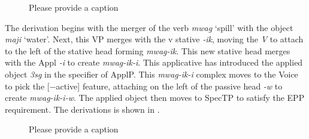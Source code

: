 \documentclass[output=paper]{langscibook}
\begin{document}
\begin{figure}
\caption{\label{fig:rmtree2}\color{red}Please provide a caption} 
\end{figure}

The derivation begins with the merger of the verb \textit{mwag} `spill' with the object \textit{maji} `water'. Next, this VP merges with the v stative \textit{-ik}, moving the \textit{V} to attach to the left of the stative head forming \textit{mwag-ik}. This new stative head merges with the Appl \textit{-i} to create \textit{mwag-ik-i}. This applicative has introduced the applied object \textit{3sg} in the specifier of ApplP. This \textit{mwag-ik-i} complex moves to the Voice to pick the [−active] feature, attaching on the left of the passive head \textit{-w} to create \textit{mwag-ik-i-w}. The applied object then moves to SpecTP to satisfy the EPP requirement. The derivations is shown in .

\begin{figure}
\caption{\label{fig:rmtree3}\color{red}Please provide a caption}
\end{figure}
\end{document}
